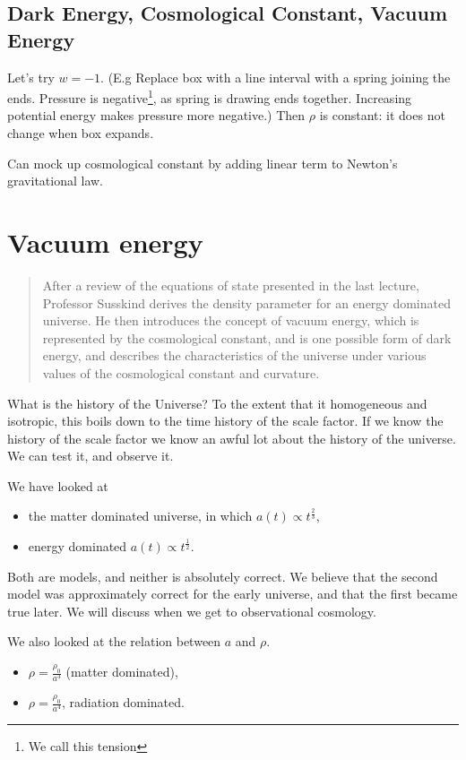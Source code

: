\documentclass[]{article}
\begin{document}
\subsection{Dark Energy, Cosmological Constant, Vacuum Energy}

Let's try $w=-1$. (E.g Replace box with a line interval with a spring joining the ends. Pressure is negative\footnote{We call this tension}, as spring is drawing ends together. Increasing potential energy makes pressure more negative.) Then $\rho$ is constant: it does not change when box expands.

Can mock up cosmological constant by adding linear term to Newton's gravitational law.

\section{Vacuum energy}

\begin{quotation}
	After a review of the equations of state presented in the last lecture, Professor Susskind derives the density parameter for an energy dominated universe.  He then introduces the concept of vacuum energy, which is represented by the cosmological constant, and is one possible form of dark energy, and describes the characteristics of the universe under various values of the cosmological constant and curvature.
\end{quotation}

What is the history of the Universe? To the extent that it homogeneous and isotropic, this boils down to the time history of the scale factor. If we know the history of the scale factor we know an awful lot about the history of the universe. We can test it, and observe it.

We have looked at \begin{itemize}
	\item the matter dominated universe, in  which $a(t)\propto t^{\frac{2}{3}}$, 
	\item energy dominated $a(t)\propto t^\frac{1}{2}$.
\end{itemize}

Both are models, and neither is absolutely correct. We believe that the second model was approximately correct for the early universe, and that the first became true later. We will discuss when we get to observational cosmology.

We also looked at the relation between $a$ and $\rho$. \begin{itemize}
	\item $\rho =\frac{\rho_0}{a^3}$ (matter dominated),
	\item  $\rho =\frac{\rho_0}{a^4}$, radiation dominated.
\end{itemize}
\end{document}
